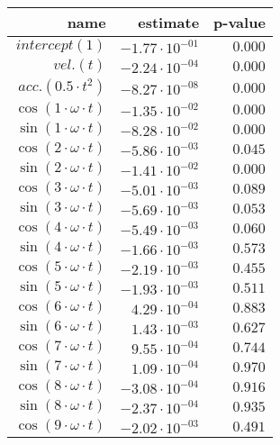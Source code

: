 \begin{tabular}{r|rr}
\hline
 name                           & estimate               & p-value   \\
\hline
 $intercept (1)$                & $-1.77 \cdot 10^{-01}$ & $0.000$   \\
 $vel. (t)$                     & $-2.24 \cdot 10^{-04}$ & $0.000$   \\
 $acc. (0.5 \cdot t^2)$         & $-8.27 \cdot 10^{-08}$ & $0.000$   \\
 $\cos(1 \cdot \omega \cdot t)$ & $-1.35 \cdot 10^{-02}$ & $0.000$   \\
 $\sin(1 \cdot \omega \cdot t)$ & $-8.28 \cdot 10^{-02}$ & $0.000$   \\
 $\cos(2 \cdot \omega \cdot t)$ & $-5.86 \cdot 10^{-03}$ & $0.045$   \\
 $\sin(2 \cdot \omega \cdot t)$ & $-1.41 \cdot 10^{-02}$ & $0.000$   \\
 $\cos(3 \cdot \omega \cdot t)$ & $-5.01 \cdot 10^{-03}$ & $0.089$   \\
 $\sin(3 \cdot \omega \cdot t)$ & $-5.69 \cdot 10^{-03}$ & $0.053$   \\
 $\cos(4 \cdot \omega \cdot t)$ & $-5.49 \cdot 10^{-03}$ & $0.060$   \\
 $\sin(4 \cdot \omega \cdot t)$ & $-1.66 \cdot 10^{-03}$ & $0.573$   \\
 $\cos(5 \cdot \omega \cdot t)$ & $-2.19 \cdot 10^{-03}$ & $0.455$   \\
 $\sin(5 \cdot \omega \cdot t)$ & $-1.93 \cdot 10^{-03}$ & $0.511$   \\
 $\cos(6 \cdot \omega \cdot t)$ & $4.29 \cdot 10^{-04}$  & $0.883$   \\
 $\sin(6 \cdot \omega \cdot t)$ & $1.43 \cdot 10^{-03}$  & $0.627$   \\
 $\cos(7 \cdot \omega \cdot t)$ & $9.55 \cdot 10^{-04}$  & $0.744$   \\
 $\sin(7 \cdot \omega \cdot t)$ & $1.09 \cdot 10^{-04}$  & $0.970$   \\
 $\cos(8 \cdot \omega \cdot t)$ & $-3.08 \cdot 10^{-04}$ & $0.916$   \\
 $\sin(8 \cdot \omega \cdot t)$ & $-2.37 \cdot 10^{-04}$ & $0.935$   \\
 $\cos(9 \cdot \omega \cdot t)$ & $-2.02 \cdot 10^{-03}$ & $0.491$   \\
\hline
\end{tabular}\hspace{1cm}\begin{tabular}{r|rr}

\end{tabular}
